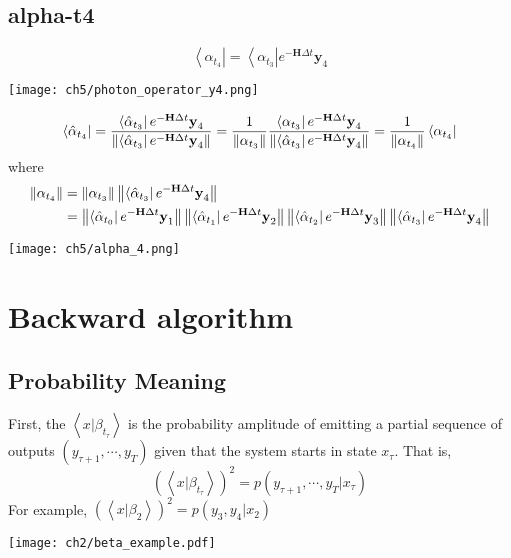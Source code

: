 \subsection{alpha-t4}
\begin{definition}
\begin{equation}
        \left< \alpha_{t_4} \right| = \left< \alpha_{t_3} \right| e^{-\textbf{H}\Delta t} \textbf{y}_4
\end{equation}
\begin{center}
        \texttt{[image: ch5/photon\_operator\_y4.png]}   
\end{center}
\begin{equation}
        \left< \hat{\alpha}_{t_4} \right| 
	= \frac{\left< \hat{\alpha}_{t_3} \right| e^{-\textbf{H}\Delta t} \textbf{y}_4}{\left\lVert\left< \hat{\alpha}_{t_3} \right| e^{-\textbf{H}\Delta t} \textbf{y}_4\right\rVert} 
        = \frac{1}{\left\lVert\alpha_{t_{3}}\right\rVert} \frac{\left< \alpha_{t_3} \right| e^{-\textbf{H}\Delta t} \textbf{y}_4}{\left\lVert\left< \hat{\alpha}_{t_3} \right| e^{-\textbf{H}\Delta t} \textbf{y}_4\right\rVert} 
        = \frac{1}{\left\lVert\alpha_{t_4}\right\rVert} \left< \alpha_{t_4} \right|
\end{equation}
where
\begin{equation}
\begin{split}
        \left\lVert\alpha_{t_4}\right\rVert &= \left\lVert\alpha_{t_{3}}\right\rVert \left\lVert\left< \hat{\alpha}_{t_3} \right| e^{-\textbf{H}\Delta t} \textbf{y}_4\right\rVert\\
        &= \left\lVert\left< \hat{\alpha}_{t_{0}} \right| e^{-\textbf{H}\Delta t} \textbf{y}_1\right\rVert \left\lVert\left< \hat{\alpha}_{t_1} \right| e^{-\textbf{H}\Delta t} \textbf{y}_2\right\rVert \left\lVert\left < \hat{\alpha}_{t_{2}} \right| e^{-\textbf{H}\Delta t} \textbf{y}_3\right\rVert \left\lVert\left < \hat{\alpha}_{t_{3}} \right| e^{-\textbf{H}\Delta t} \textbf{y}_4\right\rVert
\end{split}
\label{eq:alphat4}
\end{equation}
\begin{center}
        \texttt{[image: ch5/alpha\_4.png]}
\end{center}
\end{definition}

\section{Backward algorithm}
\subsection{Probability Meaning}
First, the $ \left<x|\beta_{t_{\tau}} \right>$ is the probability amplitude of emitting a partial sequence of outputs $(y_{\tau+1},\cdots,y_{T})$ given that the system starts in state $x_{\tau}$. That is,
\begin{equation}
        (\left<x|\beta_{t_{\tau}} \right>)^2 = p(y_{\tau+1},\cdots,y_{T}|x_{\tau})
\end{equation}
For example, $(\left<x|\beta_{2} \right>)^2 = p(y_3, y_4|x_2)$
\begin{center}
        \texttt{[image: ch2/beta\_example.pdf]}
\end{center}

